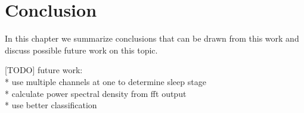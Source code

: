 \chapter{Conclusion}
\label{chapter:conclusion}

In this chapter we summarize conclusions that can be drawn from this work and discuss possible future work on this topic.



[TODO]
\newline
\newline
future work:\\
* use multiple channels at one to determine sleep stage\\
* calculate power spectral density from fft output\\
* use better classification